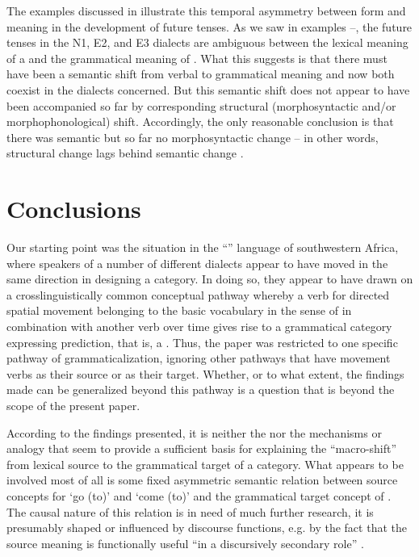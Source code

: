 \documentclass[output=paper]{langsci/langscibook}
\begin{document}
  The  examples discussed in  illustrate this temporal asymmetry between form and meaning in the development of future tenses. As we saw in examples --, the future tenses in the \textsc N1, E2, and E3 dialects are ambiguous between the lexical meaning of a  and the grammatical meaning of . What this suggests is that there must have been a semantic shift from verbal to grammatical meaning and now both coexist in the dialects concerned. But this semantic shift does not appear to have been accompanied so far by corresponding structural (morphosyntactic and/or morphophonological) shift. Accordingly, the only reasonable conclusion is that there was semantic but so far no morphosyntactic change -- in other words, structural change lags behind semantic change \citep{Heinefc}.  



\section{Conclusions}\label{sec:heine:5}



Our starting point was the situation in the ``'' language  of southwestern Africa, where speakers of a number of different dialects appear to have moved in the same direction in designing a  category. In doing so, they appear to have drawn on a crosslinguistically common conceptual pathway whereby a verb for directed spatial movement belonging to the basic vocabulary in the sense of \citet{Swadesh1952} in combination with another verb over time gives rise to a grammatical category expressing prediction, that is, a . Thus, the paper was restricted to one specific pathway of grammaticalization, ignoring other pathways that have movement verbs as their source or  as their target. Whether, or to what extent, the findings made can be generalized beyond this pathway is a question that is beyond the scope of the present paper. 



  According to the findings presented, it is neither the  nor the  mechanisms or analogy that seem to provide a sufficient basis for explaining the ``macro-shift'' from lexical source to the grammatical target of a  category. What appears to be involved most of all is some fixed asymmetric semantic relation between source concepts for `go (to)' and `come (to)' and the grammatical target concept of . The causal nature of this relation is in need of much further research, it is presumably shaped or influenced by discourse functions, e.g. by the fact that the source meaning is functionally useful ``in a discursively secondary role'' \citep[65]{Harder2011}. 
\end{document}
